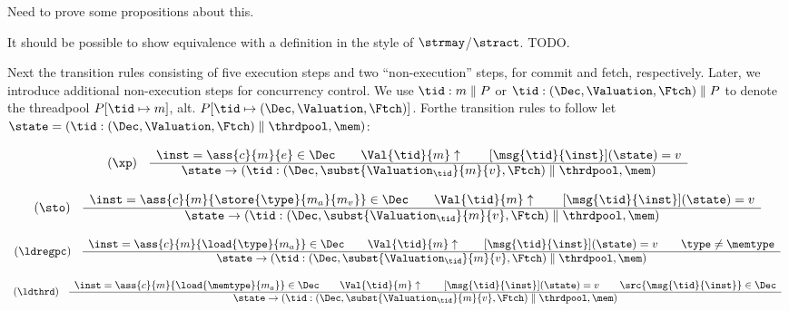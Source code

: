 Need to prove some propositions about this.

It should be possible to show equivalence with a definition in the style of $\strmay$/$\stract$. TODO.

Next the transition rules consisting of five execution steps and two ``non-execution'' steps, for commit and fetch, respectively. Later, we introduce additional non-execution steps for concurrency control.
We use $\tid:m\parallel P$ or $\tid:(\Dec,\Valuation,\Ftch)\parallel P$ to denote the
threadpool $P[\tid\mapsto m]$, alt. $P[\tid\mapsto(\Dec,\Valuation,\Ftch)]$. Forthe transition rules to follow let $\state=(\tid:(\Dec, \Valuation, \Ftch)\parallel\thrdpool,\mem)$:

  \[
    \begin{array}{cc}
(\xp)
&
\begin{array}{c}
  \inst = \ass{c}{m}{e}  \in \Dec \qquad \Val{\tid}{m}\uparrow \qquad
  [\msg{\tid}{\inst}](\state) = v
\\ \hline
\state \rightarrow (\tid:(\Dec,
\subst{\Valuation_{\tid}}{m}{v}, \Ftch)\parallel\thrdpool,\mem)
\end{array}\\
\end{array}
\]

\[
\begin{array}{cc}
(\sto)
&
\begin{array}{c}
  \inst = \ass{c}{m}{\store{\type}{m_a}{m_v}}\in\Dec \qquad \Val{\tid}{m}\uparrow \qquad
  [\msg{\tid}{\inst}](\state) = v
\\ \hline
\state \rightarrow (\tid:(\Dec,
\subst{\Valuation_{\tid}}{m}{v}, \Ftch)\parallel\thrdpool,\mem)
\end{array}\\
\end{array}
\]

\[
    \begin{array}{cc}
(\ldregpc)
&
\begin{array}{c}
  \inst = \ass{c}{m}{\load{\type}{m_a}}  \in \Dec \qquad \Val{\tid}{m}\uparrow \qquad [\msg{\tid}{\inst}](\state) = v \qquad \type\neq\memtype
\\ \hline
\state \rightarrow (\tid:(\Dec,
\subst{\Valuation_{\tid}}{m}{v}, \Ftch)\parallel\thrdpool,\mem)
\end{array}\\
\end{array}
\]

\[
    \begin{array}{cc}
(\ldthrd)
&
\begin{array}{c}
  \inst = \ass{c}{m}{\load{\memtype}{m_a}}  \in \Dec \qquad \Val{\tid}{m}\uparrow \qquad [\msg{\tid}{\inst}](\state) = v
  \qquad \src{\msg{\tid}{\inst}} \in\Dec
\\ \hline
\state \rightarrow (\tid:(\Dec,
\subst{\Valuation_{\tid}}{m}{v}, \Ftch)\parallel\thrdpool,\mem)
\end{array}\\
\end{array}
\]

